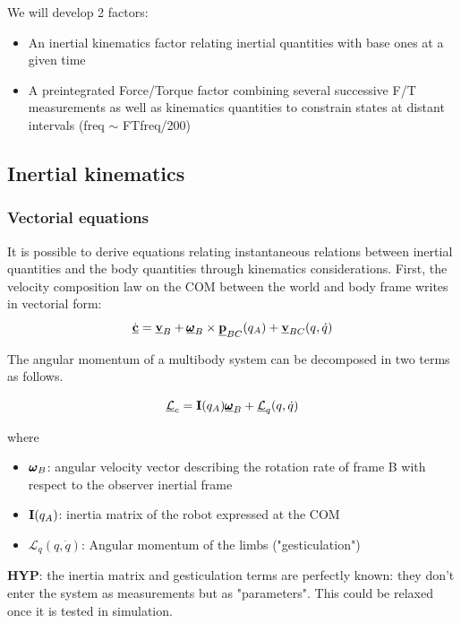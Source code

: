 \documentclass[11pt]{article}
\newcommand{\posiv}[1]{\underline{\bfp}_{#1}}
\newcommand{\velv}[1]{\underline{\bfv}_{#1}}
\newcommand{\angvelv}[1]{\underline{\pmb{\omega}}_{#1}}
\newcommand{\angvel}[2]{\prescript{#1}{}{\pmb{\omega}}_{#2}}
\newcommand{\AM}{\mathcal{L}}
\newcommand{\AMv}{\underline{\mathcal{L}}}
\newcommand{\COMv}{\underline{\bfc}}
\begin{document}
We will develop 2 factors: 

\begin{itemize}
    \item An inertial kinematics factor relating inertial quantities with base ones at a given time
    \item A preintegrated Force/Torque factor combining several successive F/T measurements as well as kinematics quantities to constrain states at distant intervals (freq $\sim$ FTfreq/200)
\end{itemize}


\subsection{Inertial kinematics}
\subsubsection{Vectorial equations}
It is possible to derive equations relating instantaneous relations between inertial quantities and the body quantities through kinematics considerations.
First, the velocity composition law on the COM between the world and body frame writes in vectorial form:
\begin{equation}
\dot{\COMv} = \velv{B} + \angvelv{B} \times \posiv{BC}(q_A) + \velv{BC}(q,\dot{q}) 
\end{equation}

The angular momentum of a multibody system can be decomposed in two terms as follows.

\begin{equation}
\AMv_c = \bfI(q_A) \angvelv{B} + \AMv_q (q,\dot{q})   
\end{equation}

where

\begin{itemize}
    \item \( \angvel{}{B} \): angular velocity vector describing the rotation rate of frame B with respect to the observer inertial frame
    \item \( {\bf I}(q_A) \): inertia matrix of the robot expressed at the COM
    \item \( \AM_q (q,\dot{q}) \): Angular momentum of the limbs ("gesticulation")
\end{itemize}

\textbf{HYP}: the inertia matrix and gesticulation terms are perfectly known: they don't enter the system as measurements but as "parameters". This could be relaxed once it is tested in simulation.
\end{document}
